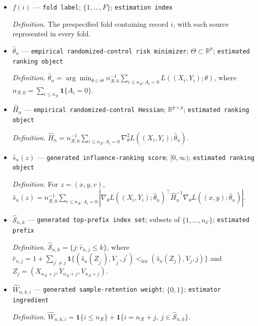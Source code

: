 \documentclass{article}
\begin{document}
\begin{itemize}
  \par\smallskip\noindent\emph{Definition.} \texttt{A fixed number of folds.}
  \item \(f(i)\) --- \texttt{fold label}; \(\{1,\ldots,F\}\); \texttt{estimation index}
  \par\smallskip\noindent\emph{Definition.} The prespecified fold containing record \(i\), with each source represented in every fold.
  \item \(\widehat\theta_n\) --- \texttt{empirical randomized-\allowbreak{}control risk minimizer}; \(\Theta\subset\mathbb R^p\); \texttt{estimated ranking object}
  \par\smallskip\noindent\emph{Definition.} \(\widehat\theta_n=\arg\min_{\theta\in\Theta}n_{\mathcal R,0}^{-1}\sum_{i\le n_{\mathcal R}:A_i=0}L((X_i,Y_i);\theta)\), where \(n_{\mathcal R,0}=\sum_{i\le n_{\mathcal R}}\mathbf 1\{A_i=0\}\).
  \item \(\widehat H_n\) --- \texttt{empirical randomized-\allowbreak{}control Hessian}; \(\mathbb R^{p\times p}\); \texttt{estimated ranking object}
  \par\smallskip\noindent\emph{Definition.} \(\widehat H_n=n_{\mathcal R,0}^{-1}\sum_{i\le n_{\mathcal R}:A_i=0}\nabla_\theta^2L((X_i,Y_i);\widehat\theta_n)\).
  \item \(\widehat s_n(z)\) --- \texttt{generated influence-\allowbreak{}ranking score}; \([0,\infty)\); \texttt{estimated ranking object}
  \par\smallskip\noindent\emph{Definition.} For \(z=(x,y,v)\), \(\widehat s_n(z)=n_{\mathcal R,0}^{-1}\sum_{i\le n_{\mathcal R}:A_i=0}|\nabla_\theta L((X_i,Y_i);\widehat\theta_n)^\top\widehat H_n^{-1}\nabla_\theta L((x,y);\widehat\theta_n)|\).
  \item \(\widehat{\mathcal S}_{n,k}\) --- \texttt{generated top-\allowbreak{}prefix index set}; subsets of \(\{1,\ldots,n_{\mathcal E}\}\); \texttt{estimated prefix}
  \par\smallskip\noindent\emph{Definition.} \(\widehat{\mathcal S}_{n,k}=\{j:\widehat r_{n,j}\le k\}\), where \(\widehat r_{n,j}=1+\sum_{j^{\prime}\ne j}\mathbf 1\{(\widehat s_n(Z_{j^{\prime}}),V_{j^{\prime}},j^{\prime})<_{\mathrm{lex}}(\widehat s_n(Z_j),V_j,j)\}\) and \(Z_j=(X_{n_{\mathcal R}+j},Y_{n_{\mathcal R}+j},V_{n_{\mathcal R}+j})\).
  \item \(\widehat W_{n,k,i}\) --- \texttt{generated sample-\allowbreak{}retention weight}; \(\{0,1\}\); \texttt{estimator ingredient}
  \par\smallskip\noindent\emph{Definition.} \(\widehat W_{n,k,i}=\mathbf 1\{i\le n_{\mathcal R}\}+\mathbf 1\{i=n_{\mathcal R}+j,\ j\in\widehat{\mathcal S}_{n,k}\}\).

\end{itemize}
\end{document}
